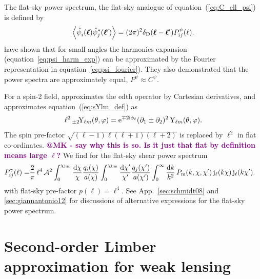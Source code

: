 \documentclass[fleqn,usenatbib]{mnras} %
\newcommand{\pref}{{\cal A}}
\renewcommand{\vec}{\bm}
\newcommand{\ch}[1]{\textcolor{purple}{\bf #1}}
\begin{document}
The flat-sky power spectrum, the flat-sky analogue of equation~(\ref{eq:C_ell_psi}) is defined by
%
\begin{equation}
  \left\langle \hat \psi_i^{}(\vec \ell) \hat \psi_j^\ast(\vec \ell^\prime) \right\rangle
    = (2\pi)^2 \delta_{\rm D}(\vec \ell - \vec \ell^\prime) P^\psi_{ij}(\ell).
  \label{eq:P_ell_psi}
\end{equation}
%
\cite{2000PhRvD..62d3007H} have shown that for small angles the harmonics
expansion (equation~\ref{eq:psi_harm_exp}) can be approximated by the Fourier
representation in equation~\ref{eq:psi_fourier}). They also demonstrated that the power
spectra are approximately equal, $P^\psi \approx C^\psi$.

For a spin-2 field, \cite{2000PhRvD..62d3007H} approximates the edth operator by Cartesian derivatives, and approximates
equation~(\ref{eq:sYlm_def}) as
%
\begin{equation}
  \ell^2 \, _{\pm2}\!{\rm Y}_{\ell m}(\theta, \varphi) =  {\rm e}^{{\mp}2 {\rm i} \phi_\ell}
    (\partial_1 \pm \partial_2)^2 \, {\rm Y}_{\ell m}(\theta, \varphi).
  \label{eq:sYlm_def_flat}
\end{equation}
%
The spin pre-factor $\sqrt{(\ell-1) \ell (\ell+1) (\ell+2)}$ is replaced by $\ell^2$ in flat co-ordinates. \ch{@MK - say why this is so.  Is it just that flat by definition means large $\ell$?}
We find for the flat-sky shear power spectrum
%
\begin{align}
  P^\gamma_{ij}(\ell) 
                 = & \frac 2 \pi \, \ell^4 \, \pref^2
                 \int_{0}^{\chi_{\rm lim}} \frac{\rm d \chi}{\chi} \frac{q_i(\chi)}{a(\chi)}
                \int_{0}^{\chi_{\rm lim}} \frac{\rm d \chi^\prime}{\chi^\prime}
                \frac{q_j(\chi^\prime)}{a(\chi^\prime)}
                \int_0^\infty \frac{{\rm d} k}{k^2} \, P_{\rm m}(k, \chi, \chi^\prime) \,
                {\rm j}_\ell(k \chi) \, {\rm j}_\ell(k \chi^\prime) .
  \label{eq:P_ell_gamma_full_der}
\end{align}
%
with flat-sky pre-factor $p(\ell) = \ell^4$. 
See App.~\ref{sec:schmidt08} and \ref{sec:giannantonio12} for discussions of alternative expressions for the flat-sky power spectrum.


\section{Second-order Limber approximation for weak lensing}
\label{sec:L2}
\end{document}
